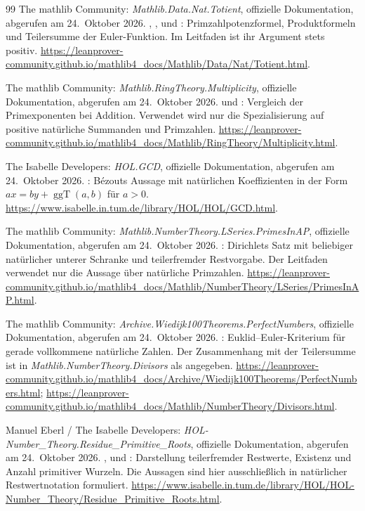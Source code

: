 \begin{thebibliography}{99}
The mathlib Community: \emph{Mathlib.Data.Nat.Totient},
offizielle Dokumentation, abgerufen am 24.~Oktober 2026.
, ,
 und :
Primzahlpotenzformel, Produktformeln und Teilersumme der Euler-Funktion.
Im Leitfaden ist ihr Argument stets positiv.
\url{https://leanprover-community.github.io/mathlib4_docs/Mathlib/Data/Nat/Totient.html}.


The mathlib Community: \emph{Mathlib.RingTheory.Multiplicity},
offizielle Dokumentation, abgerufen am 24.~Oktober 2026.
 und :
Vergleich der Primexponenten bei Addition. Verwendet wird nur
die Spezialisierung auf positive natürliche Summanden und Primzahlen.
\url{https://leanprover-community.github.io/mathlib4_docs/Mathlib/RingTheory/Multiplicity.html}.

The Isabelle Developers: \emph{HOL.GCD}, offizielle Dokumentation,
abgerufen am 24.~Oktober 2026.
: Bézouts Aussage mit natürlichen Koeffizienten
in der Form $ax=by+\operatorname{ggT}(a,b)$ für $a>0$.
\url{https://www.isabelle.in.tum.de/library/HOL/HOL/GCD.html}.

The mathlib Community: \emph{Mathlib.NumberTheory.LSeries.PrimesInAP},
offizielle Dokumentation, abgerufen am 24.~Oktober 2026.
: Dirichlets Satz
mit beliebiger natürlicher unterer Schranke und teilerfremder Restvorgabe.
Der Leitfaden verwendet nur die Aussage über natürliche Primzahlen.
\url{https://leanprover-community.github.io/mathlib4_docs/Mathlib/NumberTheory/LSeries/PrimesInAP.html}.

The mathlib Community: \emph{Archive.Wiedijk100Theorems.PerfectNumbers},
offizielle Dokumentation, abgerufen am 24.~Oktober 2026.
: Euklid--Euler-Kriterium
für gerade vollkommene natürliche Zahlen. Der Zusammenhang mit der
Teilersumme ist in \emph{Mathlib.NumberTheory.Divisors} als
 angegeben.
\url{https://leanprover-community.github.io/mathlib4_docs/Archive/Wiedijk100Theorems/PerfectNumbers.html};
\url{https://leanprover-community.github.io/mathlib4_docs/Mathlib/NumberTheory/Divisors.html}.

Manuel Eberl / The Isabelle Developers:
\emph{HOL-Number\_Theory.Residue\_Primitive\_Roots},
offizielle Dokumentation, abgerufen am 24.~Oktober 2026.
,
 und
: Darstellung teilerfremder Restwerte,
Existenz und Anzahl primitiver Wurzeln.
Die Aussagen sind hier ausschließlich in natürlicher Restwertnotation
formuliert.
\url{https://www.isabelle.in.tum.de/library/HOL/HOL-Number_Theory/Residue_Primitive_Roots.html}.



\end{thebibliography}
